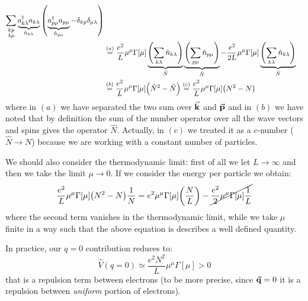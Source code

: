 \documentclass[11pt, a4paper, twoside, openright]{article}
\begin{document}
\begin{itemize}
\begin{itemize}
\begin{equation*}
\begin{split}
  \sum_{\substack{k p\\ \lambda  \mu  } }^{}
  \underbrace{a_{k \lambda } ^\dag a_{k \lambda }}_{\hat{n}_{k\lambda } }
  \qty( \underbrace{a_{p \mu }^\dag a_{p \mu } }_{\hat{n}_{p \mu } } - \delta _{k p} \delta _{\mu \lambda }  )   \\
  & \overset{(a)}{=}  \frac{e^2}{L} \mu ^\mu \Gamma [\mu ] \underbrace{ \qty(\sum_{k \lambda }^{} \hat{n}_{k \lambda }   )  }_{\hat{N} }
  \underbrace{\qty(\sum_{p \mu }^{} \hat{n}_{p \mu }   ) }_{\hat{N} }
  -  \frac{e^2}{2L}  \mu ^\mu \Gamma [\mu ]  \underbrace{ \qty( \sum_{k \lambda }^{} \hat{n}_{k \lambda }    )  }_{\hat{N} } \\
  & \overset{(b)}{=}  \frac{e^2}{L} \mu ^\mu \Gamma [\mu ] \qty(\hat{N}^2 - \hat{N}  )
  \overset{(c)}{=} \frac{e^2}{L}  \mu ^\mu \Gamma [\mu ] \qty(N^2 - N)
\end{split}
\end{equation*}
where in \( (a) \) we have separated the two sum over   \( \va{k} \) and \( \va{p} \) and in \( (b) \) we have noted that by definition the sum of the number operator over all the wave vectors and spins gives the operator \( \hat{N}  \).
Actually, in \( (c) \)  we treated it as a \( c \)-number (\( \hat{N} \rightarrow N  \)) because we are working with a constant number of particles.





We should also consider the thermodynamic limit: first of all we let \(  L \rightarrow \infty  \) and then we take the limit \( \mu \rightarrow 0 \). If we consider the energy per particle we obtain:
\begin{equation*}
  \frac{e^2}{L}  \mu ^\mu \Gamma [\mu ] \qty(N^2-N) \frac{1}{N}
  = e^2  \mu ^\mu \Gamma [\mu ] \qty(\frac{N}{L}) - \cancel{\frac{e^2}{2}  \mu ^\mu \Gamma [\mu ] \frac{1}{L}}
\end{equation*}
where the second term vanishes in the thermodynamic limit, while we take \( \mu  \) finite in a way such that the above equation is describes a well defined quantity.

In practice, our \( q=0 \) contribution reduces to:
\begin{equation*}
  \hat{V} (q=0) \simeq  \frac{e^2 N^2}{L} \mu ^\mu \Gamma [\mu ]>0
\end{equation*}
that is a repulsion term between electrons (to be more precise, since \( \va{q}=0 \)  it is a repulsion between \emph{uniform} portion of electrons).



\end{itemize}
\end{itemize}
\end{document}
